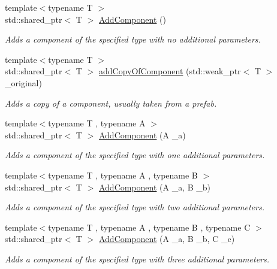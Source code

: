 \begin{DoxyCompactItemize}
{\footnotesize template$<$typename T $>$ }\\std\+::shared\+\_\+ptr$<$ T $>$ \hyperlink{classfrontier_1_1_entity_a5e19d6aee12b8d96605887e5576e6eb0}{Add\+Component} ()
\begin{DoxyCompactList}\small\item\em Adds a component of the specified type with no additional parameters. \end{DoxyCompactList}\item 
{\footnotesize template$<$typename T $>$ }\\std\+::shared\+\_\+ptr$<$ T $>$ \hyperlink{classfrontier_1_1_entity_a7e8950fc46a87fca465a94f66ac40494}{add\+Copy\+Of\+Component} (std\+::weak\+\_\+ptr$<$ T $>$ \+\_\+original)
\begin{DoxyCompactList}\small\item\em Adds a copy of a component, usually taken from a prefab. \end{DoxyCompactList}\item 
{\footnotesize template$<$typename T , typename A $>$ }\\std\+::shared\+\_\+ptr$<$ T $>$ \hyperlink{classfrontier_1_1_entity_ac554988ee6313f4ef9d5e777825d82a0}{Add\+Component} (A \+\_\+a)
\begin{DoxyCompactList}\small\item\em Adds a component of the specified type with one additional parameters. \end{DoxyCompactList}\item 
{\footnotesize template$<$typename T , typename A , typename B $>$ }\\std\+::shared\+\_\+ptr$<$ T $>$ \hyperlink{classfrontier_1_1_entity_a203192666b3d100e5cf2e0f4427e3d85}{Add\+Component} (A \+\_\+a, B \+\_\+b)
\begin{DoxyCompactList}\small\item\em Adds a component of the specified type with two additional parameters. \end{DoxyCompactList}\item 
{\footnotesize template$<$typename T , typename A , typename B , typename C $>$ }\\std\+::shared\+\_\+ptr$<$ T $>$ \hyperlink{classfrontier_1_1_entity_ac1af2d9f16c04053a3370afdf08ce3ea}{Add\+Component} (A \+\_\+a, B \+\_\+b, C \+\_\+c)
\begin{DoxyCompactList}\small\item\em Adds a component of the specified type with three additional parameters. \end{DoxyCompactList}\item 

\end{DoxyCompactItemize}
